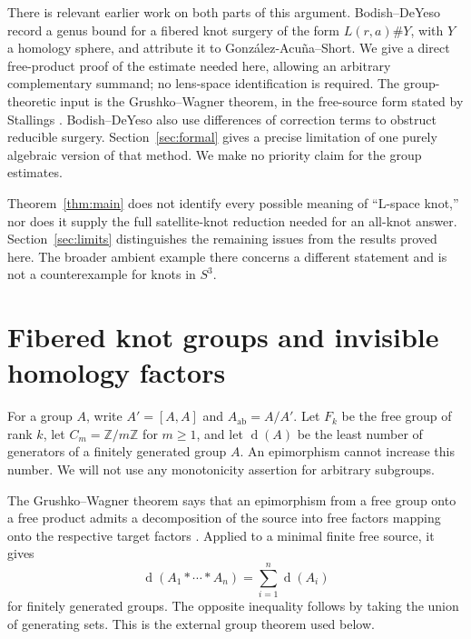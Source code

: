 \documentclass[11pt]{article}
\theoremstyle{remark}
\newcommand{\Z}{\mathbb Z}
\newcommand{\ab}{\mathrm{ab}}
\newcommand{\gen}{\operatorname{d}}
\begin{document}
There is relevant earlier work on both parts of this argument. Bodish--DeYeso \cite[Theorem~1.2]{BD} record a genus bound for a fibered knot surgery of the form $L(r,a)\#Y$, with $Y$ a homology sphere, and attribute it to Gonz\'alez-Acu\~na--Short. We give a direct free-product proof of the estimate needed here, allowing an arbitrary complementary summand; no lens-space identification is required. The group-theoretic input is the Grushko--Wagner theorem, in the free-source form stated by Stallings \cite[Section~1.B.5, p.~6]{Stallings}. Bodish--DeYeso also use differences of correction terms to obstruct reducible surgery. Section~\ref{sec:formal} gives a precise limitation of one purely algebraic version of that method. We make no priority claim for the group estimates.

Theorem~\ref{thm:main} does not identify every possible meaning of ``L-space knot,'' nor does it supply the full satellite-knot reduction needed for an all-knot answer. Section~\ref{sec:limits} distinguishes the remaining issues from the results proved here. The broader ambient example there concerns a different statement and is not a counterexample for knots in $S^3$.

\section{Fibered knot groups and invisible homology factors}\label{sec:groups}

For a group $A$, write $A'=[A,A]$ and $A_{\ab}=A/A'$. Let $F_k$ be the free group of rank $k$, let $C_m=\Z/m\Z$ for $m\geq1$, and let $\gen(A)$ be the least number of generators of a finitely generated group $A$. An epimorphism cannot increase this number. We will not use any monotonicity assertion for arbitrary subgroups.

The Grushko--Wagner theorem says that an epimorphism from a free group onto a free product admits a decomposition of the source into free factors mapping onto the respective target factors \cite[Section~1.B.5]{Stallings}. Applied to a minimal finite free source, it gives
\begin{equation}\label{eq:grushko}
 \gen(A_1*\cdots*A_n)=\sum_{i=1}^n\gen(A_i)
\end{equation}
for finitely generated groups. The opposite inequality follows by taking the union of generating sets. This is the external group theorem used below.
\end{document}
